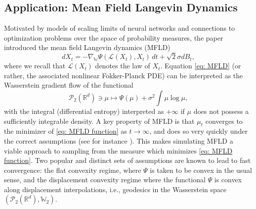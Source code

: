 \documentclass[11pt,reqno]{amsart}
\numberwithin{equation}{section}
\theoremstyle{definition}
\def\R{{\mathbb R}}
\def\Law{\mathcal{L}}
\newcommand{\wgrad}{\nabla_{\W}}
\newcommand{\W}{\mathbb W}
\begin{document}
\subsection{Application: Mean Field Langevin Dynamics}
Motivated by models of scaling limits of neural networks and connections to optimization problems over the space of probability measures, the paper \cite{MeanFieldLangevin} introduced the mean field Langevin dynamics (MFLD)
\begin{equation} 
    \label{eq: MFLD}
    dX_t =-\wgrad \Psi(\Law(X_t),X_t)\,dt+\sqrt{2}\sigma dB_t, 
\end{equation}
where we recall that $\Law(X_t)$ denotes the law of $X_t$.
Equation \eqref{eq: MFLD} (or rather, the associated nonlinear Fokker-Planck PDE) can be interpreted as the Wasserstein gradient flow of the functional 
\begin{equation}
\label{eq: MFLD function}
    \mathcal P_2(\R^d)\ni\mu \mapsto \Psi(\mu)+\sigma^2 \int \mu\log\mu,
\end{equation} 
with the integral (differential entropy) interpreted as $+\infty$ if $\mu$ does not possess a sufficiently integrable density.
A key property of MFLD is that  $\mu_t$ converges to the minimizer of \eqref{eq: MFLD function} as $t\to\infty$, and does so very quickly under the correct assumptions (see for instance \cite{chizat2022meanfield}). This makes simulating MFLD a viable approach to sampling from the measure which minimizes \eqref{eq: MFLD function}. Two popular and distinct sets of assumptions are known to lead to fast convergence: the flat convexity regime, where $\Psi$ is taken to be convex in the usual sense, and the displacement convexity regime where the functional $\Psi$ is convex along displacement interpolations, i.e., geodesics in the Wasserstein space $(\mathcal{P}_2(\R^d),\W_2)$.
\end{document}
